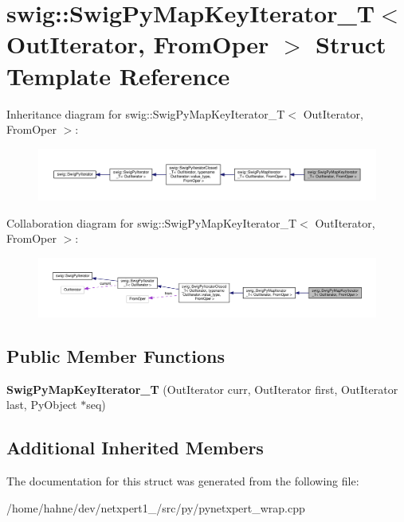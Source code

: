 \hypertarget{structswig_1_1SwigPyMapKeyIterator__T}{}\section{swig\+:\+:Swig\+Py\+Map\+Key\+Iterator\+\_\+T$<$ Out\+Iterator, From\+Oper $>$ Struct Template Reference}
\label{structswig_1_1SwigPyMapKeyIterator__T}


Inheritance diagram for swig\+:\+:Swig\+Py\+Map\+Key\+Iterator\+\_\+T$<$ Out\+Iterator, From\+Oper $>$\+:\nopagebreak
\begin{figure}[H]
\begin{center}
\leavevmode
\includegraphics[width=350pt]{structswig_1_1SwigPyMapKeyIterator__T__inherit__graph}
\end{center}
\end{figure}


Collaboration diagram for swig\+:\+:Swig\+Py\+Map\+Key\+Iterator\+\_\+T$<$ Out\+Iterator, From\+Oper $>$\+:\nopagebreak
\begin{figure}[H]
\begin{center}
\leavevmode
\includegraphics[width=350pt]{structswig_1_1SwigPyMapKeyIterator__T__coll__graph}
\end{center}
\end{figure}
\subsection*{Public Member Functions}
\begin{DoxyCompactItemize}
\item 
{\bfseries Swig\+Py\+Map\+Key\+Iterator\+\_\+T} (Out\+Iterator curr, Out\+Iterator first, Out\+Iterator last, Py\+Object $\ast$seq)\hypertarget{structswig_1_1SwigPyMapKeyIterator__T_ac666b974a2e029753404d74665590daf}{}\label{structswig_1_1SwigPyMapKeyIterator__T_ac666b974a2e029753404d74665590daf}

\end{DoxyCompactItemize}
\subsection*{Additional Inherited Members}


The documentation for this struct was generated from the following file\+:\begin{DoxyCompactItemize}
\item 
/home/hahne/dev/netxpert1\+\_/src/py/pynetxpert\+\_\+wrap.\+cpp\end{DoxyCompactItemize}

